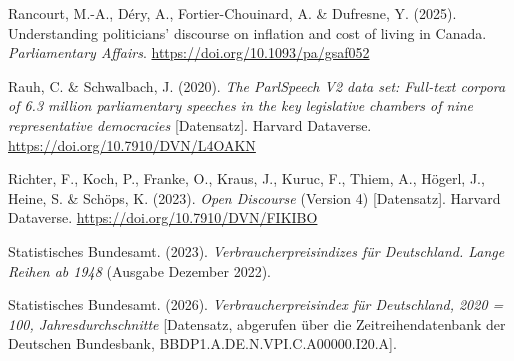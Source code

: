 \documentclass[11pt,a4paper]{article}
\newenvironment{literatur}{\begin{list}{}{\setlength{\leftmargin}{1.5em}\setlength{\itemindent}{-1.5em}\setlength{\itemsep}{0.35em}\small}\raggedright}{\end{list}}
\begin{document}
\begin{literatur}
\item Rancourt, M.-A., Déry, A., Fortier-Chouinard, A. \& Dufresne, Y. (2025). Understanding politicians' discourse on inflation and cost of living in Canada. \emph{Parliamentary Affairs}. \url{https://doi.org/10.1093/pa/gsaf052}

\item Rauh, C. \& Schwalbach, J. (2020). \emph{The ParlSpeech V2 data set: Full-text corpora of 6.3 million parliamentary speeches in the key legislative chambers of nine representative democracies} {[}Datensatz{]}. Harvard Dataverse. \url{https://doi.org/10.7910/DVN/L4OAKN}

\item Richter, F., Koch, P., Franke, O., Kraus, J., Kuruc, F., Thiem, A., Högerl, J., Heine, S. \& Schöps, K. (2023). \emph{Open Discourse} (Version 4) {[}Datensatz{]}. Harvard Dataverse. \url{https://doi.org/10.7910/DVN/FIKIBO}

\item Statistisches Bundesamt. (2023). \emph{Verbraucherpreisindizes für Deutschland. Lange Reihen ab 1948} (Ausgabe Dezember 2022).

\item Statistisches Bundesamt. (2026). \emph{Verbraucherpreisindex für Deutschland, 2020 = 100, Jahresdurchschnitte} {[}Datensatz, abgerufen über die Zeitreihendatenbank der Deutschen Bundesbank, BBDP1.A.DE.N.VPI.C.A00000.I20.A{]}.
\end{literatur}
\end{document}
